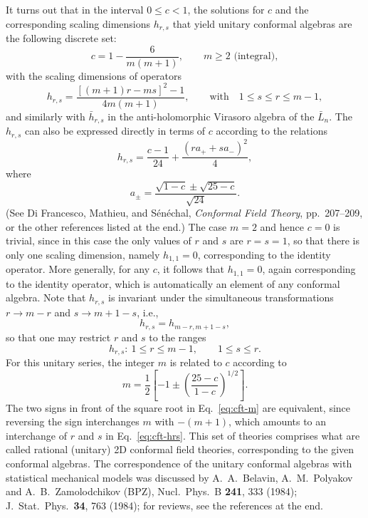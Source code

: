 It turns out that in the interval $0\le c<1$, the solutions for $c$ and the corresponding scaling dimensions $h_{r,s}$
that yield unitary conformal algebras are the following discrete set:
\begin{equation}
  c = 1-\frac{6}{m(m+1)}, \qquad m\ge2 \text{ (integral)} ,
\end{equation}
with the scaling dimensions of operators
\begin{equation}\label{eq:cft-hrs}
  h_{r,s} = \frac{[(m+1)r-ms]^2-1}{4m(m+1)}, \qquad\text{with}\quad 1\le s\le r\le m-1 ,
\end{equation}
and similarly with $\bar h_{r,s}$ in the anti-holomorphic Virasoro algebra of the $\bar L_n$. The $h_{r,s}$ can also be
expressed directly in terms of $c$ according to the relations
\begin{equation}
  h_{r,s} = \frac{c-1}{24} + \frac{(ra_++sa_-)^2}{4} ,
\end{equation}
where
\begin{equation}
  a_\pm = \frac{\sqrt{1-c}\pm\sqrt{25-c}}{\sqrt{24}} .
\end{equation}
(See Di Francesco, Mathieu, and S\'en\'echal, \emph{Conformal Field Theory}, pp.~207--209, or the other references
listed at the end.) The case $m = 2$ and hence $c = 0$ is trivial, since in this case the only values of $r$ and $s$
are $r = s = 1$, so that there is only one scaling dimension, namely $h_{1,1} = 0$, corresponding to the identity
operator. More generally, for any $c$, it follows that $h_{1,1} = 0$, again corresponding to the identity operator,
which is automatically an element of any conformal algebra. Note that $h_{r,s}$ is invariant under the simultaneous
transformations $r\to m-r$ and $s\to m+1-s$, i.e.,
\begin{equation}\label{eq:cft-hsym}
  h_{r,s} = h_{m-r,m+1-s} ,
\end{equation}
so that one may restrict $r$ and $s$ to the ranges
\begin{equation}
  h_{r,s}:\ 1\le r\le m-1, \qquad 1\le s\le r .
\end{equation}
For this unitary series, the integer $m$ is related to $c$ according to
\begin{equation}\label{eq:cft-m}
  m = \frac{1}{2}\left[-1\pm\left(\frac{25-c}{1-c}\right)^{1/2}\right] .
\end{equation}
The two signs in front of the square root in Eq.~\eqref{eq:cft-m} are equivalent, since reversing the sign
interchanges $m$ with $-(m+1)$, which amounts to an interchange of $r$ and $s$ in Eq.~\eqref{eq:cft-hrs}. This set of
theories comprises what are called rational (unitary) 2D conformal field theories, corresponding to the given
conformal algebras. The correspondence of the unitary conformal algebras with statistical mechanical models was
discussed by A.~A.~Belavin, A.~M.~Polyakov and A.~B.~Zamolodchikov (BPZ), Nucl.\ Phys.\ B \textbf{241}, 333 (1984);
J.\ Stat.\ Phys.\ \textbf{34}, 763 (1984); for reviews, see the references at the end.

